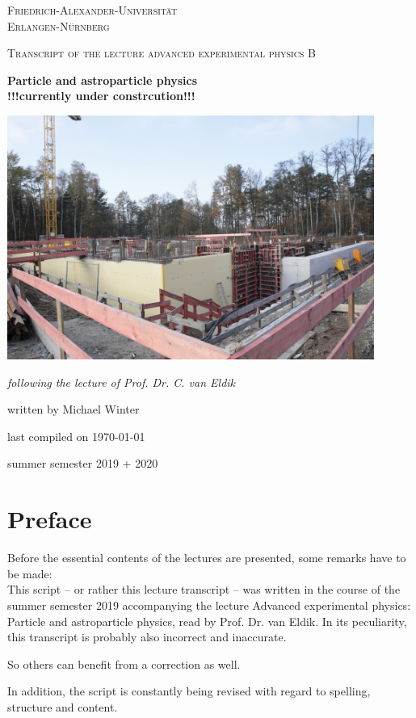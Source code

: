 \documentclass[headtopline=0.08em,headsepline=0.04em, bindingoffset = 5mm]{scrbook}
\numberwithin{equation}{chapter} %
\begin{document}
{
\begin{titlepage}
	\centering
	\vfill
	{\scshape\LARGE Friedrich-Alexander-Universität \\ Erlangen-Nürnberg \par}
	\vfill
	{\scshape\Large Transcript of the lecture advanced experimental physics B\\   \par}
	\vfill
	{\huge\bfseries Particle and astroparticle physics\\
	!!!currently under constrcution!!!\par}
	\vfill
	\includegraphics[width=0.9\textwidth]{imgs/ecap.jpg}
	\vfill
	{\Large\itshape following the lecture of Prof. Dr. C. van Eldik\par}
	\vfill
	{\large written by Michael Winter \par}
    \vfill
    {\large last compiled on \today}
    \vfill
	{\large summer semester 2019 + 2020\par}
	\vfill
\end{titlepage}}

\tableofcontents %
\clearpage %

\chapter*{Preface}
Before the essential contents of the lectures are presented, some remarks have to be made:\\
This script -- or rather this lecture transcript -- was written in the course of the summer semester 2019 accompanying the lecture Advanced experimental physics: Particle and astroparticle physics, read by Prof. Dr. van Eldik. In its peculiarity, this transcript is probably also incorrect and inaccurate.

 So others can benefit from a correction as well.

In addition, the script is constantly being revised with regard to spelling, structure and content.











\listoffigures
\end{document}
